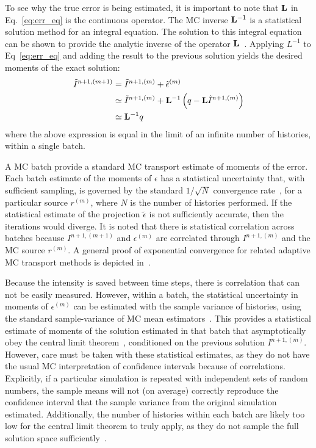 To see why the true error is being estimated, it is important to note that 
$\mathbf{L}$ in Eq.~\eqref{eq:err_eq} is the continuous operator.  The MC inverse $\mathbf{L}^{-1}$ is
a statistical solution method for an integral equation.  The solution to this integral
equation can be shown to provide the analytic inverse of the operator $\mathbf{L}$~\cite{shultis_mc,cj_thesis}.  Applying $L^{-1}$ to Eq~\eqref{eq:err_eq} and adding the
result to the previous solution yields the desired moments of the exact solution:
\begin{align}
   \tilde I^{n+1,(m+1)} &= \tilde I^{n+1,(m)} + \tilde\epsilon^{(m)} \\
                  &\simeq  \tilde I^{n+1,(m)} + \mathbf{L}^{-1} \left(q - \mathbf{L} \tilde I^{n+1,(m)} \right) \\
                  &\simeq \mathbf{L}^{-1} q
\end{align}
where the above expression is equal in the limit of an infinite number of histories,
within a single batch.  

A MC batch provide a standard MC transport estimate of moments of the error.  Each batch
estimate of the moments of $\epsilon$ has a statistical uncertainty that, with sufficient
sampling, is governed by the standard $1/\sqrt{N}$ convergence rate~\cite{shultis_mc}, for a
particular source $r^{(m)}$, where $N$ is the number of histories performed.  If the statistical estimate of the projection $\tilde\epsilon$ is not sufficiently
accurate, then the iterations would diverge. It is noted that there is statistical correlation across batches because
$I^{n+1,(m+1)}$ and $\epsilon^{(m)}$ are correlated through $I^{n+1,(m)}$ and the MC source $r^{(m)}$.  
A general proof of exponential
convergence for related adaptive MC transport methods is depicted in~\cite{spanier_mc}.  

Because the intensity is saved between time steps, there is correlation that
can not be easily measured.  However, within a batch, the statistical uncertainty in moments of $\epsilon^{(m)}$ can be estimated with the
sample variance of histories, using the standard sample-variance of MC mean
estimators~\cite{shultis_mc}.  This provides a statistical estimate of moments
of the solution estimated in that batch that asymptotically obey the central
limit theorem~\cite{shultis_mc}, conditioned on the previous solution
$I^{n+1,(m)}$.  However, care must be taken with these statistical estimates,
as they do not have the usual MC interpretation of confidence intervals because
of correlations.  Explicitly, if a particular simulation is repeated with
independent sets of random numbers, the sample means will not (on average)
correctly reproduce the confidence interval that the sample variance from the
original simulation estimated.  Additionally, the number of histories within
each batch are likely too low  for the central limit theorem to truly apply, as
they  do not sample the full solution space sufficiently~\cite{mcnp}.  


